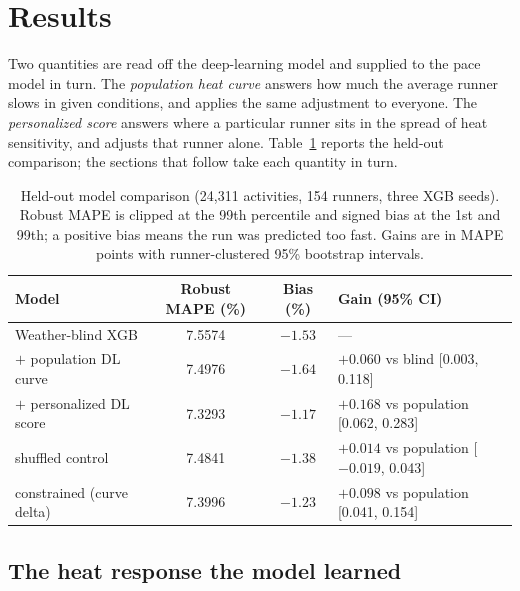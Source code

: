 \documentclass[11pt]{article}
\renewcommand{\_}{\textunderscore\allowbreak}
\begin{document}
\section{Results}
\label{sec:results}

Two quantities are read off the deep-learning model and supplied to the pace model in turn. The \emph{population heat curve} answers how much the average runner slows in given conditions, and applies the same adjustment to everyone. The \emph{personalized score} answers where a particular runner sits in the spread of heat sensitivity, and adjusts that runner alone. Table~\ref{tab:mainresult} reports the held-out comparison; the sections that follow take each quantity in turn.

\begin{table}[!ht]
  \centering
  \small
  \caption{Held-out model comparison (24{,}311 activities, 154 runners, three XGB seeds). Robust MAPE is clipped at the 99th percentile and signed bias at the 1st and 99th; a positive bias means the run was predicted too fast. Gains are in MAPE points with runner-clustered 95\% bootstrap intervals.}
  \label{tab:mainresult}
  \begin{tabular}{@{}lccl@{}}
    \toprule
    \textbf{Model} & \textbf{Robust MAPE (\%)} & \textbf{Bias (\%)} & \textbf{Gain (95\% CI)} \\
    \midrule
    Weather-blind XGB               & 7.5574 & $-1.53$ & --- \\
    $+$ population DL curve          & 7.4976 & $-1.64$ & $+0.060$ vs blind [0.003, 0.118] \\
    $+$ personalized DL score        & 7.3293 & $-1.17$ & $+0.168$ vs population [0.062, 0.283] \\
    \quad shuffled control          & 7.4841 & $-1.38$ & $+0.014$ vs population [$-0.019$, 0.043] \\
    \quad constrained (curve delta) & 7.3996 & $-1.23$ & $+0.098$ vs population [0.041, 0.154] \\
    \bottomrule
  \end{tabular}
\end{table}

\subsection{The heat response the model learned}
\end{document}
